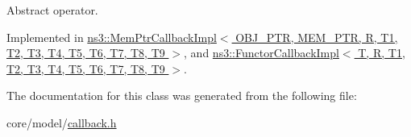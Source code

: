 Abstract operator. 



Implemented in \hyperlink{classns3_1_1MemPtrCallbackImpl_aed96923993c142ddd8ca50af2d748d59}{ns3\+::\+Mem\+Ptr\+Callback\+Impl$<$ O\+B\+J\+\_\+\+P\+T\+R, M\+E\+M\+\_\+\+P\+T\+R, R, T1, T2, T3, T4, T5, T6, T7, T8, T9 $>$}, and \hyperlink{classns3_1_1FunctorCallbackImpl_a8c1e9fe8409d82a9b4b8719e6f87f2cc}{ns3\+::\+Functor\+Callback\+Impl$<$ T, R, T1, T2, T3, T4, T5, T6, T7, T8, T9 $>$}.



The documentation for this class was generated from the following file\+:\begin{DoxyCompactItemize}
\item 
core/model/\hyperlink{callback_8h}{callback.\+h}\end{DoxyCompactItemize}
